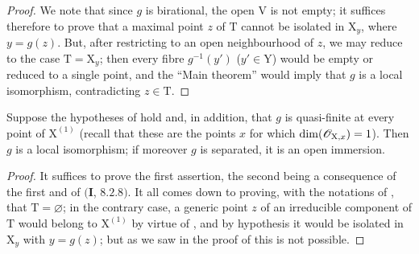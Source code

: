 \begin{proof}
We note that since $g$ is birational, the open $\mathrm{V}$ is not empty; it suffices therefore to prove that a maximal point $z$ of $\mathrm{T}$ cannot be isolated in $\mathrm{X}_y$, where $y=g(z)$.
But, after restricting to an open neighbourhood of $z$, we may reduce to the case $\mathrm{T}=\mathrm{X}_y$; then every fibre $g^{-1}(y')$ ($y'\in\mathrm{Y}$) would be empty or reduced to a single point, and the ``Main theorem''  would imply that $g$ is a local isomorphism, contradicting $z\in\mathrm{T}$.
\end{proof}

\begin{corollary}[21.12.13]
\label{IV.21.12.13}
Suppose the hypotheses of  hold and, in addition, that $g$ is quasi-finite at every point of $\mathrm{X}^{(1)}$ \textup{(recall that these are the points $x$ for which $\dim(\mathscr{O}_{\mathrm{X},x})=1$)}.  Then $g$ is a local isomorphism; if moreover $g$ is separated, it is an open immersion.
\end{corollary}

\begin{proof}
It suffices to prove the first assertion, the second being a consequence of the first and of $(\mathbf{I}$, $8.2.8)$.
It all comes down to proving, with the notations of , that $\mathrm{T}=\varnothing$; in the contrary case, a generic point $z$ of an irreducible component of $\mathrm{T}$ would belong to $\mathrm{X}^{(1)}$ by virtue of , and by hypothesis it would be isolated in $\mathrm{X}_y$ with $y=g(z)$; but as we saw in the proof of  this is not possible.
\end{proof}

